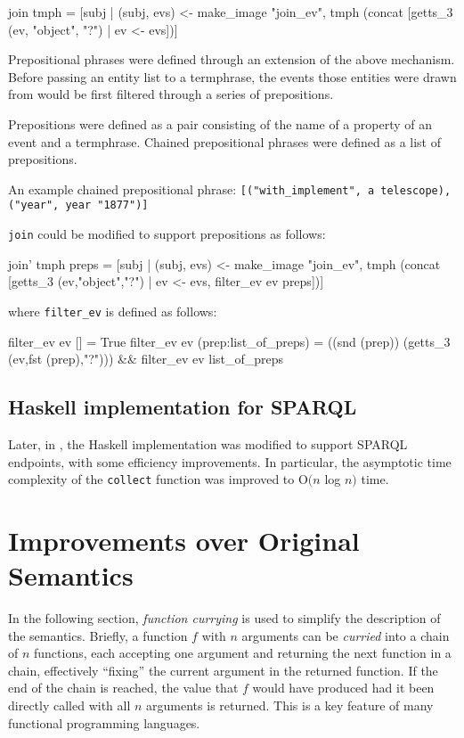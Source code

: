 \documentclass[../main.tex]{subfiles}
\begin{document}
\begin{code}
  join tmph = [subj | (subj, evs) <- make_image "join_ev",
       tmph (concat [getts_3 (ev,  "object", "?") | ev <- evs])]
\end{code}

Prepositional phrases were defined through an extension of the above
mechanism.  Before passing an entity list to a termphrase, the events
those entities were drawn from would be first filtered through a series
of prepositions.

Prepositions were defined as a pair consisting of the name of a property
of an event and a termphrase.  Chained prepositional phrases were defined
as a list of prepositions.

An example chained prepositional phrase: \texttt{[("with\_implement", a
telescope), ("year", year "1877")]}

\texttt{join} could be modified to support prepositions as follows:

\begin{code}
  join’ tmph preps = [subj | (subj, evs) <- make_image "join_ev", 
    tmph (concat [getts_3 (ev,"object","?") | ev <- evs,
      filter_ev ev preps])]
\end{code}

where \texttt{filter\_ev} is defined as follows\cite{frost2014denotational}:

\begin{code}
  filter_ev ev [] = True
  filter_ev ev (prep:list_of_preps)
    = ((snd (prep)) (getts_3 (ev,fst (prep),"?")))
        && filter_ev ev list_of_preps
\end{code}

\subsection{Haskell implementation for SPARQL}

Later, in \cite{agboola2015extensible}, the Haskell implementation was modified
to support SPARQL endpoints, with some efficiency improvements.  In particular, the asymptotic time complexity of the \texttt{collect} function was improved to O$(n$ log $n)$ time.

\section{Improvements over Original Semantics}

In the following section, {\em function currying}\cite{currying} is used to simplify the description of the semantics.
Briefly, a function $f$ with $n$ arguments can be {\em curried} into a chain of $n$ functions, each accepting one argument and returning the next function
in a chain, effectively ``fixing'' the current argument in the returned function.  If the end of the chain is reached, the value that $f$
would have produced had it been directly called with all $n$ arguments is returned.  This is a key feature of many functional programming languages\cite{haskell}.
\end{document}

